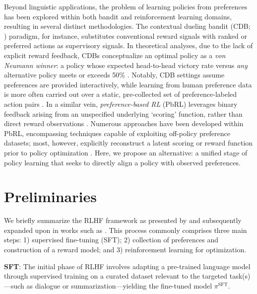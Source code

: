Beyond linguistic applications, the problem of learning policies from preferences has been explored within both bandit and reinforcement learning domains, resulting in several distinct methodologies. The contextual dueling bandit (CDB; \cite{yue2012karmed,dudik2015contextual}) paradigm, for instance, substitutes conventional reward signals with ranked or preferred actions as supervisory signals. In theoretical analyses, due to the lack of explicit reward feedback, CDBs conceptualize an optimal policy as a \textit{von Neumann winner}: a policy whose expected head-to-head victory rate versus \textit{any} alternative policy meets or exceeds 50\% \citep{dudik2015contextual}. Notably, CDB settings assume preferences are provided interactively, while learning from human preference data is more often carried out over a static, pre-collected set of preference-labeled action pairs \citep{yan2022human}. In a similar vein, \textit{preference-based RL} (PbRL) leverages binary feedback arising from an unspecified underlying `scoring' function, rather than direct reward observations \citep{BusaFekete2014,ruiz2023dueling}. Numerous approaches have been developed within PbRL, encompassing techniques capable of exploiting off-policy preference datasets; most, however, explicitly reconstruct a latent scoring or reward function prior to policy optimization \citep{jain2013learning,BusaFekete2014,christiano2017deep,sadigh2017active,kupcsik2018learning}. Here, we propose an alternative: a unified stage of policy learning that seeks to directly align a policy with observed preferences.

\section{Preliminaries}\label{section:prelims}

We briefly summarize the RLHF framework as presented by \citeauthor{ziegler2020finetuning} and subsequently expanded upon in works such as \citep{stiennon2022learning, bai2022training, ouyang2022training}. This process commonly comprises three main steps: 1) supervised fine-tuning (SFT); 2) collection of preferences and construction of a reward model; and 3) reinforcement learning for optimization.

\textbf{SFT}: The initial phase of RLHF involves adapting a pre-trained language model through supervised training on a curated dataset relevant to the targeted task(s)—such as dialogue or summarization—yielding the fine-tuned model $\pi^\text{SFT}$.

